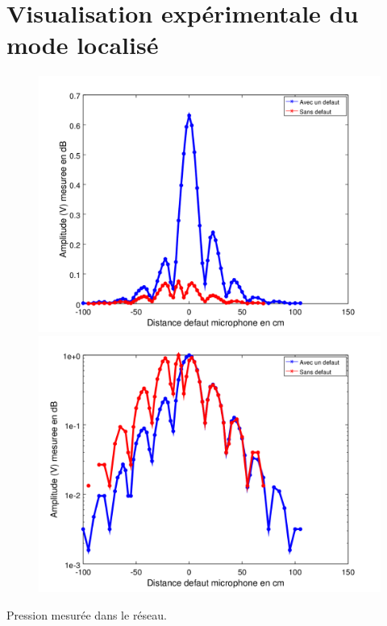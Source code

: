 \documentclass[12pt,xcolor=x11names,compress, notes=show]{beamer}%
\begin{document}
\section{Visualisation expérimentale du mode localisé}

\begin{frame}{\insertsectionhead}
\begin{figure}
\centering
\includegraphics[scale=0.3]{visu1_lin.png}
\includegraphics[scale=0.3]{visu1_log.png}
\end{figure}

\begin{center}
	Pression mesurée dans le réseau.
\end{center}

\end{frame}
\end{document}
